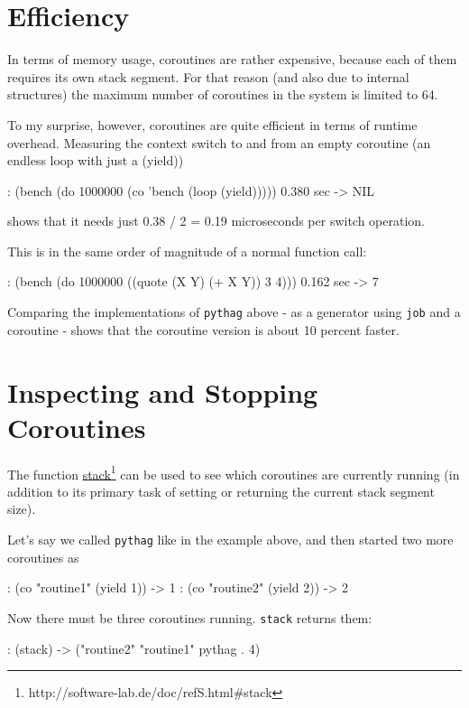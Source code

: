 \section{Efficiency}
\label{sec:coroutines-efficiency}

In terms of memory usage, coroutines are rather expensive, because each of them
requires its own stack segment. For that reason (and also due to internal
structures) the maximum number of coroutines in the system is limited to 64.

To my surprise, however, coroutines are quite efficient in terms of runtime
overhead. Measuring the context switch to and from an empty coroutine (an
endless loop with just a (yield))
\begin{wideverbatim}
   : (bench (do 1000000 (co 'bench (loop (yield)))))
   0.380 sec
   -> NIL
\end{wideverbatim}

shows that it needs just 0.38 / 2 = 0.19 microseconds per switch operation.

This is in the same order of magnitude of a normal function call:
\begin{wideverbatim}
   : (bench (do 1000000 ((quote (X Y) (+ X Y)) 3 4)))
   0.162 sec
   -> 7
\end{wideverbatim}

Comparing the implementations of \texttt{pythag} above - as a generator using \texttt{job}
and a coroutine - shows that the coroutine version is about 10 percent faster.

\section{Inspecting and Stopping Coroutines}
\label{sec:coroutines-inspecting-and-stopping-coroutines}

The function \underline{stack}\footnote{http://software-lab.de/doc/refS.html\#stack} can be used to
see which coroutines are currently running (in addition to its primary task of
setting or returning the current stack segment size).

Let's say we called \texttt{pythag} like in the example above, and then started two
more coroutines as
\begin{wideverbatim}
   : (co "routine1" (yield 1))
   -> 1
   : (co "routine2" (yield 2))
   -> 2
\end{wideverbatim}

Now there must be three coroutines running. \texttt{stack} returns them:
\begin{wideverbatim}
   : (stack)
   -> ("routine2" "routine1" pythag . 4)
\end{wideverbatim}


